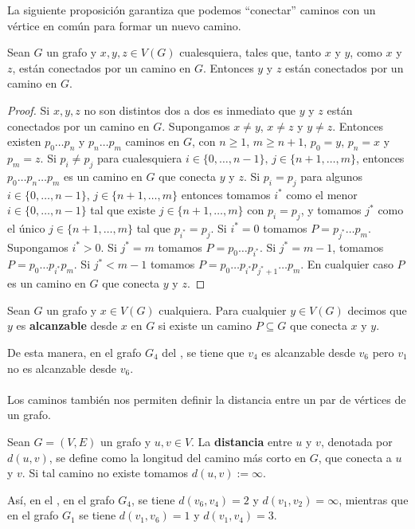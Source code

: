 La siguiente proposición garantiza que podemos ``conectar'' caminos con un vértice en común para formar un nuevo camino.
\begin{Prop}\label{Prop:Conexion_caminos}
    Sean $G$ un grafo y $x,y,z\in V(G)$ cualesquiera, tales que, tanto $x$ y $y$, como $x$ y $z$, están conectados por un camino en $G$. Entonces $y$ y $z$ están conectados por un camino en $G$.
\end{Prop}
\begin{proof}
   Si $x,y,z$ no son distintos dos a dos es inmediato que $y$ y $z$ están conectados por un camino en $G$. Supongamos $x\ne y$, $x\ne z$ y $y\ne z$. Entonces existen $p_0\dots p_n$ y $p_n\dots p_m$ caminos en $G$, con $n\ge 1$, $m\ge n+1$, $p_0=y$, $p_n=x$ y $p_m=z$. Si $p_i\ne p_j$ para cualesquiera $i\in \{0,\dots,n-1\},\, j\in\{n+1,\dots,m\}$, entonces $p_0\dots p_n\dots p_m$ es un camino en $G$ que conecta $y$ y $z$. Si $p_i=p_j$ para algunos $i\in\{0,\dots ,n-1\}, \, j\in\{n+1,\dots ,m\}$ entonces tomamos $i^*$ como el menor $i\in \{0,\dots ,n-1\}$ tal que existe $j\in \{n+1,\dots ,m\}$ con $p_i=p_j$, y tomamos $j^*$ como el único $j\in \{n+1,\dots,m\}$ tal que $p_{i^*}=p_j$. Si $i^*=0$ tomamos $P=p_{j^*}\dots p_m$. Supongamos $i^*>0$. Si $j^*=m$  tomamos $P=p_0\dots p_{i^*}$. Si $j^*=m-1$, tomamos $P=p_0\dots p_{i^*}p_m$. Si $j^*<m-1$ tomamos $P=p_0\dots p_{i^*}p_{j^*+1}\dots p_m$. En cualquier caso $P$ es un camino en $G$ que conecta $y$ y $z$.
\end{proof}
\begin{Def}
   Sean $G$ un grafo y $x\in V(G)$ cualquiera. Para cualquier $y\in V(G)$ decimos que $y$ es \textbf{alcanzable} desde $x$ en $G$ si existe un camino $P\subseteq G$ que conecta $x$ y $y$.  
\end{Def}
De esta manera, en el grafo $G_4$ del , se tiene que $v_4$ es alcanzable desde $v_6$ pero $v_1$ no es alcanzable desde $v_6$.\\\\
Los caminos también nos permiten definir la distancia entre un par de vértices de un grafo.
\begin{Def}
   Sean $G=(V,E)$ un grafo y $u,v\in V$. La \textbf{distancia} entre $u$ y $v$, denotada por $d(u,v)$, se define como la longitud del camino más corto en $G$, que conecta a $u$ y $v$. Si tal camino no existe tomamos $d(u,v):=\infty$.
\end{Def}
Así, en el , en el grafo $G_4$, se tiene $d(v_6,v_4)=2$ y $d(v_1,v_2)=\infty$, mientras que en el grafo $G_1$ se tiene $d(v_1,v_6)=1$ y $d(v_1,v_4)=3$.
